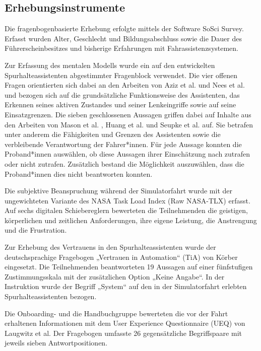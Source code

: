 \subsection{Erhebungsinstrumente}
\label{subsec:erhebungsinstrumente}

Die fragenbogenbasierte Erhebung erfolgte mittels der Software SoSci Survey. Erfasst wurden Alter, Geschlecht und Bildungsabschluss sowie die Dauer des Führerscheinbesitzes und bisherige Erfahrungen mit Fahrassistenzsystemen.

Zur Erfassung des mentalen Modells wurde ein auf den entwickelten Spurhalteassistenten abgestimmter Fragenblock verwendet. Die vier offenen Fragen orientierten sich dabei an den Arbeiten von Aziz et al. \cite{aziz2013mentalmodel} und Nees et al. \cite{nees2020mentalmodels} und bezogen sich auf die grundsätzliche Funktionsweise des Assistenten, das Erkennen seines aktiven Zustandes und seiner Lenkeingriffe sowie auf seine Einsatzgrenzen. Die sieben geschlossenen Aussagen griffen dabei auf Inhalte aus den Arbeiten von Mason et al. \cite{mason2023mapping}, Huang et al. \cite{huang2023beyond} und Seupke et al. \cite{seupke2025framework} auf. Sie betrafen unter anderem die Fähigkeiten und Grenzen des Assistenten sowie die verbleibende Verantwortung der Fahrer*innen. Für jede Aussage konnten die Proband*innen auswählen, ob diese Aussagen ihrer Einschätzung nach zutrafen oder nicht zutrafen. Zusätzlich bestand die Möglichkeit auszuwählen, dass die Proband*innen dies nicht beantworten konnten.

Die subjektive Beanspruchung während der Simulatorfahrt wurde mit der ungewichteten Variante des NASA Task Load Index (Raw NASA-TLX) \cite{hart1986nasatlx,hart2006nasatlx} erfasst. Auf sechs digitalen Schiebereglern bewerteten die Teilnehmenden die geistigen, körperlichen und zeitlichen Anforderungen, ihre eigene Leistung, die Anstrengung und die Frustration.

Zur Erhebung des Vertrauens in den Spurhalteassistenten wurde der deutschsprachige Fragebogen „Vertrauen in Automation“ (TiA) von Körber \cite{korber_tia_de} eingesetzt. Die Teilnehmenden beantworteten 19 Aussagen auf einer fünfstufigen Zustimmungsskala mit der zusätzlichen Option „Keine Angabe“. In der Instruktion wurde der Begriff „System“ auf den in der Simulatorfahrt erlebten Spurhalteassistenten bezogen.

Die Onboarding- und die Handbuchgruppe bewerteten die vor der Fahrt erhaltenen Informationen mit dem User Experience Questionnaire (UEQ) von Laugwitz et al. \cite{laugwitz2008ueq} Der Fragebogen umfasste 26 gegensätzliche Begriffspaare mit jeweils sieben Antwortpositionen.

